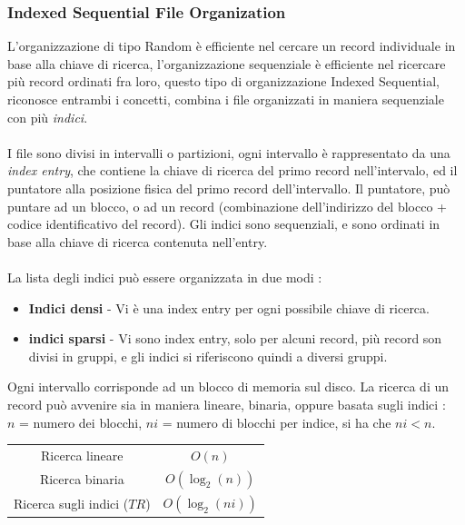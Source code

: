 \documentclass[12pt, letterpaper]{article}
\newcommand{\acc}{\\\hphantom{}\\}
\begin{document}
\subsubsection{Indexed Sequential File Organization}
L'organizzazione di tipo Random è efficiente nel cercare un record individuale in base alla chiave di ricerca, l'organizzazione 
sequenziale è efficiente nel ricercare più record ordinati fra loro, questo tipo di organizzazione Indexed Sequential, riconosce
entrambi i concetti, combina i file organizzati in maniera sequenziale con più \textit{indici}.\acc 
I file sono divisi in intervalli o partizioni, ogni intervallo è rappresentato da una \textit{index entry}, 
che contiene la chiave di ricerca del primo record nell'intervalo, ed il puntatore alla posizione fisica del primo record 
dell'intervallo. Il puntatore, può puntare ad un blocco, o ad un record (combinazione dell'indirizzo del blocco + codice identificativo 
del record). Gli indici sono sequenziali, e sono ordinati in base alla chiave di ricerca contenuta nell'entry.\acc 
La lista degli indici può essere organizzata in due modi : \begin{itemize}
    \item \textbf{Indici densi} - Vi è una index entry per ogni possibile chiave di ricerca. 
    \item \textbf{indici sparsi} - Vi sono index entry, solo per alcuni record, più record son divisi in gruppi, e gli indici 
    si riferiscono quindi a diversi gruppi.
\end{itemize}
Ogni intervallo corrisponde ad un blocco di memoria sul disco. La ricerca di un record può avvenire sia in maniera lineare, binaria, 
oppure basata sugli indici :\\
\(n\) = numero dei blocchi,  \(ni\) = numero di blocchi per indice, si ha che \(ni<n\). 
\begin{center}

    \begin{tabular}{cc}
        \rowcolor[HTML]{C0C0C0} 
        Ricerca lineare                    & \(O(n)\)                  \\
        \rowcolor[HTML]{EFEFEF} 
       Ricerca binaria               & \(O(\log_2(n))\)       \\
        \rowcolor[HTML]{C0C0C0} 
        Ricerca sugli indici (\(TR\)) & \(O(\log_2(ni))\) 
                  
        \end{tabular}
     
\end{center}
\end{document}
